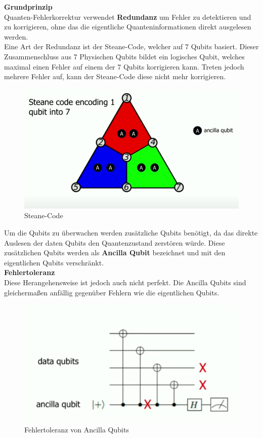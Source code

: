 \textbf{Grundprinzip}\\
Quanten-Fehlerkorrektur verwendet \textbf{Redundanz} um Fehler zu detektieren und zu korrigieren, ohne das die eigentliche Quanteninformationen direkt ausgelesen werden.\\

Eine Art der Redundanz ist der Steane-Code, welcher auf 7 Qubits basiert. Dieser Zusammenschluss aus 7 Physischen Qubits bildet ein logisches Qubit,
welches maximal einen Fehler auf einem der 7 Qubits korrigieren kann. Treten jedoch mehrere Fehler auf, kann der Steane-Code diese nicht mehr korrigieren.\\

\begin{figure}[H]
    \centering
    \includegraphics[width=0.75\linewidth]{img/Steane.png}
    \caption{Steane-Code}
    \label{fig:Steane}
\end{figure}

Um die Qubits zu überwachen werden zusätzliche Qubits benötigt, da das direkte Auslesen der daten Qubits den Quantenzustand zerstören würde.
Diese zusätzlichen Qubits werden als \textbf{Ancilla Qubit} bezeichnet und mit den eigentlichen Qubits verschränkt.\\

\textbf{Fehlertoleranz}\\
Diese Herangehensweise ist jedoch auch nicht perfekt. Die Ancilla Qubits sind gleichermaßen anfällig gegenüber Fehlern wie die eigentlichen Qubits.\\

\begin{figure}[H]
    \centering
    \includegraphics[width=0.75\linewidth]{img/Fehlertoleranz.png}
    \caption{Fehlertoleranz von Ancilla Qubits}
    \label{fig:Fehlertoleranz}
\end{figure}

